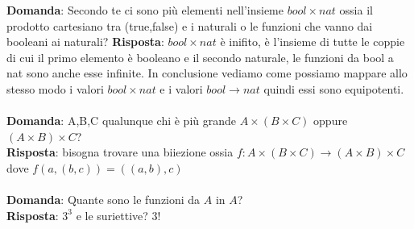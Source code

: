 \documentclass{article}
\begin{document}
\textbf{Domanda}: Secondo te ci sono più elementi nell'insieme $bool \times nat$ ossia il prodotto cartesiano tra (true,false) e i naturali o le funzioni che vanno dai booleani ai naturali?
\textbf{Risposta}: $bool \times nat$ è inifito, è l'insieme di tutte le coppie di cui il primo elemento è booleano e il secondo naturale, le funzioni da bool a nat sono anche esse infinite.
In conclusione vediamo come possiamo mappare allo stesso modo i valori $bool \times nat$ e i valori $bool \to nat$ quindi essi sono equipotenti.\\ \\
\textbf{Domanda}: A,B,C qualunque chi è più grande $A \times (B \times C)$ oppure $(A \times B) \times C$? \\
\textbf{Risposta}: bisogna trovare una biiezione ossia $f: A \times (B \times C) \to (A \times B) \times C$ dove $f(a,(b,c))=((a,b),c)$\\ \\
\textbf{Domanda}: Quante sono le funzioni da $A$ in $A$? \\
\textbf{Risposta}: $3^3$ e le suriettive? $3!$ \\ \\
\end{document}
